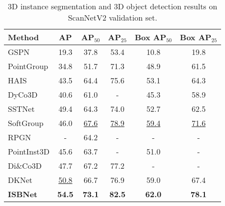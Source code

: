 \documentclass[10pt,twocolumn,letterpaper]{article}
\def\Approach{ISBNet}
\begin{document}
\begin{table}
\small
\setlength{\tabcolsep}{3.5pt}
\centering
\begin{tabular}{lccccc}
\toprule
\textbf{Method}   & \textbf{AP}     & \textbf{AP$_{50}$} & \textbf{AP$_{25}$} & \textbf{Box AP$_{50}$}     & \textbf{Box AP$_{25}$} \\ 
\midrule
GSPN \cite{yi2019gspn} & 19.3 & 37.8 & 53.4 & 10.8 & 19.8\\
PointGroup \cite{jiang2020pointgroup} & 34.8 & 51.7 & 71.3 & 48.9 & 61.5 \\
HAIS \cite{chen2021hierarchical} & 43.5 & 64.4 & 75.6 & 53.1 & 64.3 \\ 
DyCo3D \cite{he2021dyco3d} & 40.6 & 61.0 & - & 45.3 & 58.9\\
SSTNet \cite{liang2021instance} & 49.4 & 64.3 & 74.0 & 52.7 & 62.5 \\
SoftGroup \cite{vu2022softgroup} & 46.0 & \underline{67.6} & \underline{78.9} & \underline{59.4} & \underline{71.6}\\
RPGN \cite{dong2022rpgn} & - & 64.2 & - & - & -\\
PointInst3D \cite{He2022PointInst3DS3} & 45.6 & 63.7 & - & 51.0 & - \\
Di\&Co3D \cite{zhao2022divide} & 47.7 & 67.2 & 77.2 & - & - \\
DKNet \cite{wu2022dknet} & \underline{50.8} & 66.7 & 76.9 & 59.0 & 67.4 \\
\midrule
\textbf{\Approach} & \textbf{54.5} & \textbf{73.1}  & \textbf{82.5} & \textbf{62.0} & \textbf{78.1}\\
\bottomrule
\end{tabular}
\vspace{-4pt}
\caption{3D instance segmentation and 3D object detection results on ScanNetV2 validation set.}
\label{tab:scannet_val}
\vspace{-4pt}
\end{table}
\end{document}
